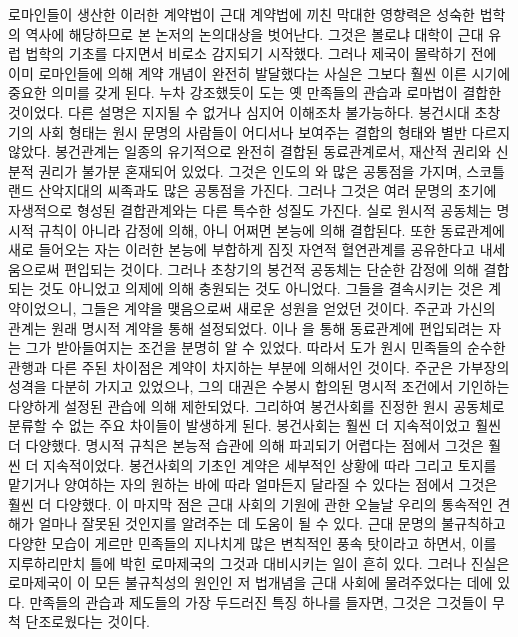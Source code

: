 로마인들이 생산한 이러한 계약법이
근대 계약법에 끼친 막대한 영향력은
성숙한 법학의 역사에 해당하므로
본 논저의 논의대상을 벗어난다.
그것은
볼로냐 대학이 근대 유럽 법학의 기초를 다지면서
비로소
감지되기 시작했다.
그러나
제국이 몰락하기 전에 이미
로마인들에 의해
계약 개념이
완전히 발달했다는 사실은
그보다 훨씬 이른 시기에
중요한 의미를 갖게 된다.
누차 강조했듯이
도는 옛 만족들의 관습과 로마법이
결합한 것이었다.
다른 설명은 지지될 수 없거나 심지어 이해조차 불가능하다.
봉건시대 초창기의 사회 형태는
원시 문명의 사람들이 어디서나 보여주는
결합의 형태와 별반 다르지 않았다.
봉건관계는 일종의 유기적으로 완전히 결합된 동료관계로서,
재산적 권리와 신분적 권리가 불가분 혼재되어 있었다.
그것은 인도의 와 많은 공통점을 가지며,
스코틀랜드 산악지대의 씨족과도 많은 공통점을 가진다.
그러나 그것은 여러 문명의 초기에 자생적으로 형성된 결합관계와는 다른
특수한 성질도 가진다.
실로 원시적 공동체는 명시적 규칙이 아니라 감정에 의해,
아니 어쩌면 본능에 의해 결합된다.
또한 동료관계에 새로 들어오는 자는
이러한 본능에 부합하게
짐짓
자연적 혈연관계를 공유한다고 내세움으로써 편입되는 것이다.
그러나 초창기의 봉건적 공동체는 단순한 감정에 의해
결합되는 것도 아니었고
의제에 의해 충원되는 것도 아니었다.
그들을 결속시키는 것은 계약이었으니,
그들은 계약을 맺음으로써 새로운 성원을 얻었던 것이다.
주군과 가신의 관계는 원래 명시적 계약을 통해 설정되었다.
이나
을 통해
동료관계에 편입되려는 자는
그가 받아들여지는 조건을 분명히 알 수 있었다.
따라서 도가 원시 민족들의 순수한 관행과 다른
주된 차이점은 계약이 차지하는 부분에 의해서인 것이다.
주군은 가부장의 성격을 다분히 가지고 있었으나,
그의 대권은
수봉시 합의된 명시적 조건에서 기인하는 다양하게 설정된 관습에 의해
제한되었다.
그리하여 봉건사회를 진정한 원시 공동체로 분류할 수 없는
주요 차이들이 발생하게 된다.
봉건사회는 훨씬 더 지속적이었고 훨씬 더 다양했다.
명시적 규칙은 본능적 습관에 의해 파괴되기 어렵다는 점에서
그것은
훨씬 더 지속적이었다.
봉건사회의 기초인 계약은
세부적인 상황에 따라
그리고
토지를 맡기거나 양여하는 자의 원하는 바에 따라
얼마든지 달라질 수 있다는 점에서
그것은
훨씬 더 다양했다.
이 마지막 점은
근대 사회의 기원에 관한 오늘날 우리의 통속적인 견해가
얼마나 잘못된 것인지를 알려주는 데 도움이 될 수 있다.
근대 문명의 불규칙하고 다양한 모습이
게르만 민족들의 지나치게 많은 변칙적인 풍속 탓이라고 하면서,
이를 지루하리만치 틀에 박힌 로마제국의 그것과 대비시키는 일이 흔히 있다.
그러나 진실은
로마제국이 이 모든 불규칙성의 원인인 저 법개념을
근대 사회에 물려주었다는 데에 있다.
만족들의 관습과 제도들의 가장 두드러진 특징 하나를 들자면,
그것은
그것들이 무척 단조로웠다는 것이다.

